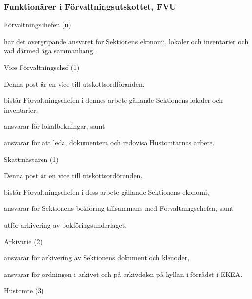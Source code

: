 \documentclass[10pt]{article}
\begin{document}
\subsubsection{Funktionärer i Förvaltningsutskottet, FVU}
\begin{emptylist}
    \item Förvaltningschefen (u)
        \begin{dashlist}
            \item har det övergripande ansvaret för Sektionens ekonomi,
                lokaler och inventarier och vad därmed äga sammanhang.
        \end{dashlist}
    \item Vice Förvaltningschef (1)
        \begin{dashlist}
            \item Denna post är en vice till utskottsordföranden.
            \item bistår Förvaltningschefen i dennes arbete gällande Sektionens lokaler och inventarier,
            \item ansvarar för lokalbokningar, samt
            \item ansvarar för att leda, dokumentera och redovisa Hustomtarnas arbete.
        \end{dashlist}
    \item Skattmästaren (1)
        \begin{dashlist}
            \item Denna post är en vice till utskottsordöranden.
            \item bistår Förvaltningschefen i dess arbete gällande Sektionens ekonomi,
            \item ansvarar för Sektionens bokföring tillsammans med Förvaltningschefen, samt
            \item utför arkivering av bokföringsunderlaget.
        \end{dashlist}
    \item Arkivarie (2)
        \begin{dashlist}
            \item ansvarar för arkivering av Sektionens dokument och
                klenoder,
            \item ansvarar för ordningen i arkivet och på arkivdelen
                på hyllan i förrådet i EKEA.
        \end{dashlist}
    \item Hustomte (3)
        \begin{dashlist}

\end{dashlist}
\end{emptylist}
\end{document}
